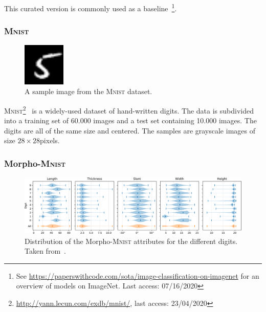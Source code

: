 This curated version is commonly used as a baseline~\citep{krizhevsky2012imagenet,Szegedy_2015_CVPR}\footnote{See \href{https://paperswithcode.com/sota/image-classification-on-imagenet}{https://paperswithcode.com/sota/image-classification-on-imagenet} for an overview of models on ImageNet. Last access: 07/16/2020}.

\subsubsection{\textsc{Mnist}}\label{subsubsec:mnist}

\begin{figure}
    \begin{center}
        \includegraphics[width=0.18\textwidth]{images/mnist_sample.png}
    \end{center}
    \caption[\textsc{Mnist} dataset sample image]{A sample image from the \textsc{Mnist} dataset.}
    \label{fig:mnist_sample}
\end{figure}

\textsc{Mnist}\footnote{\href{http://yann.lecun.com/exdb/mnist/}{http://yann.lecun.com/exdb/mnist/}, last access: 23/04/2020}~\citep{lecun1998gradient} is a widely-used dataset of hand-written digits.
The data is subdivided into a training set of 60.000 images and a test set containing 10.000 images.
The digits are all of the same size and centered.
The samples are grayscale images of size $28\times 28$pixels.

\subsubsection{Morpho-\textsc{Mnist}}\label{subsubsec:morphomnist}

\begin{figure}
    \centering
    \includegraphics[width=\textwidth]{images/morpho_mnist_distribution.png}
    \caption[Morpho-\textsc{Mnist} distribution]{Distribution of the Morpho-\textsc{Mnist} attributes for the different digits. Taken from~\citep{castro2019morpho}.}
    \label{fig:morpho_mnist_distribution}
\end{figure}

